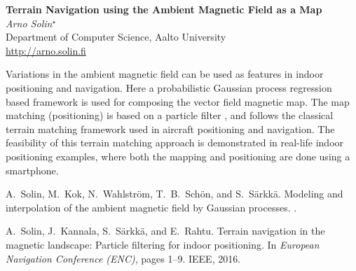 \documentclass[12pt]{article}
\newcommand{\postertitle}[1]{{\Large\bf #1}\\[12pt]}
\newcommand{\authors}[1]{\emph{#1}\\}
\newcommand{\affiliations}[1]{{#1}\\}
\newcommand{\contacts}[1]{{#1}}
\begin{document}
\begin{center}
\vspace*{0.5cm}
%
\postertitle{Terrain Navigation using the Ambient Magnetic Field as a Map}
%
\authors{Arno Solin$^\star$} %
% 
\affiliations{Department of Computer Science, Aalto University}
%
\contacts{\url{http://arno.solin.fi}} %
%
\vspace*{0.3cm}
\end{center}


Variations in the ambient magnetic field can be used as features in indoor positioning and navigation. Here a probabilistic Gaussian process regression based framework \cite{Solin+Kok+Wahlstrom+Schon+Sarkka:accepted} is used for composing the vector field magnetic map. The map matching (positioning) is based on a particle filter \cite{Solin+etal:2016}, and follows the classical terrain matching framework used in aircraft positioning and navigation. The feasibility of this terrain matching approach is demonstrated in real-life indoor positioning examples, where both the mapping and positioning are done using a smartphone.


\begin{thebibliography}{1}
  A.~Solin, M.~Kok, N.~Wahlstr{\"o}m, T.~B.~Sch{\"o}n,
  and S.~S{\"a}rkk{\"a}.
\newblock Modeling and interpolation of the ambient magnetic field by
  {G}aussian processes.
.

  A.~Solin, J.~Kannala, S.~S\"arkk\"a, and E.~Rahtu.
\newblock Terrain navigation in the magnetic landscape: {P}article filtering
  for indoor positioning.
\newblock In \emph{European Navigation Conference (ENC)}, pages 1--9. IEEE,
  2016.

\end{thebibliography}
\end{document}
